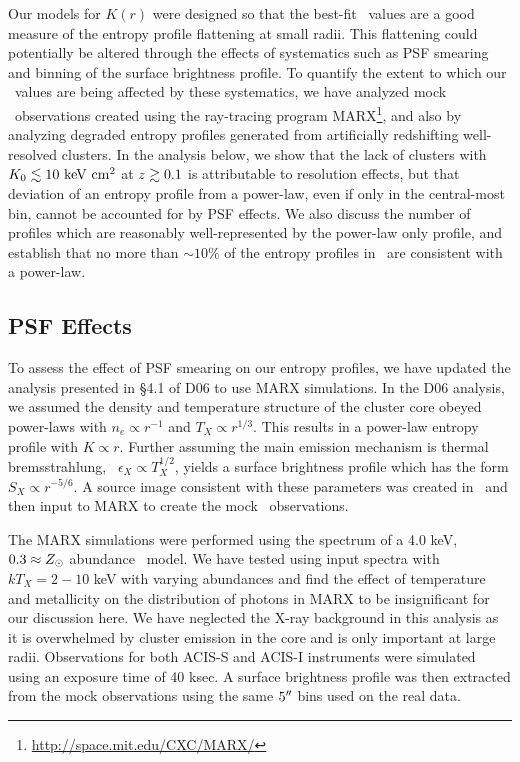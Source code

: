 \documentclass[12pt,preprint]{aastex}
\begin{document}
Our models for $K(r)$ were designed so that the best-fit \kna\ values
are a good measure of the entropy profile flattening at small
radii. This flattening could potentially be altered through the
effects of systematics such as PSF smearing and binning of the surface
brightness profile. To quantify the extent to which our
\kna\ values are being affected by these systematics, we have analyzed
mock \chandra\ observations created using the ray-tracing program
MARX\footnote{\url{http://space.mit.edu/CXC/MARX/}}, and also by
analyzing degraded entropy profiles generated from artificially
redshifting well-resolved clusters. In the analysis below, we show
that the lack of clusters with $K_0 \lesssim 10 \mathrm{\mbox{\ensuremath{\mathrm{~keV}}} \mathrm{\mbox{\ensuremath{\mathrm{~cm}}}^2}}$ at $z \gtrsim 0.1$ is
attributable to resolution effects, but that deviation of an entropy
profile from a power-law, even if only in the central-most bin, cannot
be accounted for by PSF effects. We also discuss the number of
profiles which are reasonably well-represented by the power-law only
profile, and establish that no more than $\sim 10\%$ of the entropy
profiles in \accept\ are consistent with a power-law.

\subsection{PSF Effects}
\label{sec:psf}

To assess the effect of PSF smearing on our entropy profiles, we have
updated the analysis presented in \S4.1 of D06 to use MARX
simulations. In the D06 analysis, we assumed the density and
temperature structure of the cluster core obeyed power-laws with $n_e
\propto r^{-1}$ and $T_X \propto r^{1/3}$. This results in a power-law
entropy profile with $K \propto r$. Further assuming the main emission
mechanism is thermal bremsstrahlung, \ie\ $\epsilon_X \propto
T_X^{1/2}$, yields a surface brightness profile which has the form
$S_X \propto r^{-5/6}$. A source image consistent with these
parameters was created in \idl\ and then input to MARX to create the
mock \chandra\ observations.

The MARX simulations were performed using the spectrum of a 4.0 keV,
$0.3 \approx Z_{\odot}$ abundance \mekal\ model. We have tested using
input spectra with $kT_X = 2-10$ keV with varying abundances and find
the effect of temperature and metallicity on the distribution of
photons in MARX to be insignificant for our discussion here. We have
neglected the X-ray background in this analysis as it is overwhelmed
by cluster emission in the core and is only important at large
radii. Observations for both ACIS-S and ACIS-I instruments were
simulated using an exposure time of 40 ksec. A surface brightness
profile was then extracted from the mock observations using the same
$5\mathrm{^\prime}\hskip -0.1em\mathrm{^\prime}$ bins used on the real data.
\end{document}

